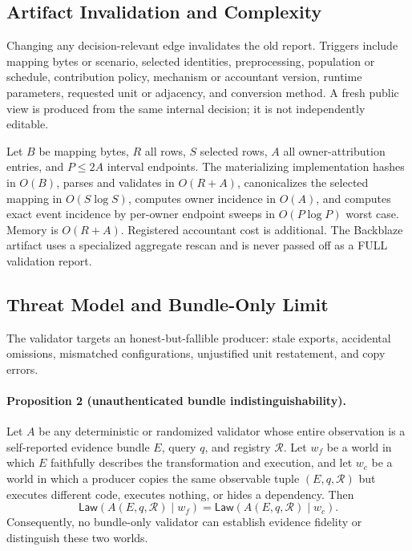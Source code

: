 \documentclass[letterpaper]{article} %
\begin{document}
\subsection{Artifact Invalidation and Complexity}

Changing any decision-relevant edge invalidates the old report.  Triggers
include mapping bytes or scenario, selected identities, preprocessing,
population or schedule, contribution policy, mechanism or accountant version,
runtime parameters, requested unit or adjacency, and conversion method.  A
fresh public view is produced from the same internal decision; it is not
independently editable.

Let $B$ be mapping bytes, $R$ all rows, $S$ selected rows, $A$ all
owner-attribution entries, and $P\leq2A$ interval endpoints.  The materializing
implementation hashes in $O(B)$, parses and validates in $O(R+A)$,
canonicalizes the selected mapping in $O(S\log S)$, computes owner incidence
in $O(A)$, and computes exact event incidence by per-owner endpoint sweeps in
$O(P\log P)$ worst case.  Memory is $O(R+A)$.  Registered accountant cost is
additional.  The Backblaze artifact uses a specialized aggregate rescan and
is never passed off as a FULL validation report.

\subsection{Threat Model and Bundle-Only Limit}

The validator targets an honest-but-fallible producer: stale exports,
accidental omissions, mismatched configurations, unjustified unit
restatement, and copy errors.

\paragraph{Proposition 2 (unauthenticated bundle indistinguishability).}
Let $A$ be any deterministic or randomized validator whose entire observation
is a self-reported evidence bundle $E$, query $q$, and registry $\mathcal R$.
Let $w_f$ be a world in which $E$ faithfully describes the transformation and
execution, and let $w_c$ be a world in which a producer copies the same
observable tuple $(E,q,\mathcal R)$ but executes different code, executes
nothing, or hides a dependency.  Then
\[
  \mathsf{Law}\!\left(A(E,q,\mathcal R)\mid w_f\right)
  =
  \mathsf{Law}\!\left(A(E,q,\mathcal R)\mid w_c\right).
\]
Consequently, no bundle-only validator can establish evidence fidelity or
distinguish these two worlds.
\end{document}
